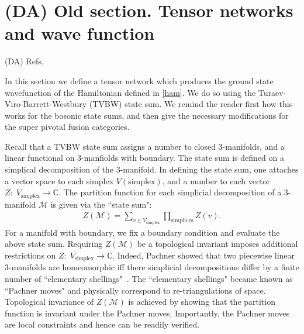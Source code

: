 \documentclass[12pt,a4paper]{article}
\newcounter{arrow}
\newcommand{\ra}{\rightarrow}
\newcommand{\cc}{\mathbb{C}}
\newcommand{\mcm}{\mathcal{M}}
\newcommand{\dave}[1]{{\color{ao(english)}\footnotesize{(DA) #1}}}
\begin{document}
\section{\dave{Old section.} Tensor networks and wave function} 
\dave{Refs.}
\cite{Turaev2010}

In this section we define a tensor network which produces the ground state wavefunction of the Hamiltonian defined in \eqref{ham}.
We do so using the Turaev-Viro-Barrett-Westbury (TVBW) state sum\cite{Turaev1992,Barrett1996}.
We remind the reader first how this works for the bosonic state sums, 
and then give the necessary modifications for the super pivotal fusion categories.



Recall that a TVBW state sum assigns a number to closed 3-manifolds, 
and a linear functional on 3-manfiolds with boundary. 
The state sum is defined on a simplical decomposition of the 3-manifold.
In defining the state sum, one attaches a vector space to each simplex $V(\text{simplex})$, and a number to each vector $Z: \; V_\text{simplex} \ra \cc$.
The partition function for each simplicial decomposition of a 3-manifold $\mcm$ is given via the ``state sum": 
\begin{align}
Z(\mcm) = \sum_{v \in V_\text{simplex} } \prod_{\text{simplices}} Z(v).
\end{align} 
For a manifold with boundary, we fix a boundary condition and evaluate the above state sum. 
Requiring $Z(\mcm)$ be a topological invariant imposes additional restrictions on $Z: \; V_\text{simplex} \ra \cc$. 
Indeed, Pachner showed that two piecewise linear 3-manifolds are homeomorphic 
iff there simplicial decompositions differ by a finite number of ``elementary shellings"~\cite{Pachner1991}.
The ``elementary shellings" became known as ``Pachner moves" and physically correspond to re-triangulations of space.
Topological invariance of $Z(\mcm)$ is achieved by showing that the partition function is invariant under the Pachner moves.
Importantly, the Pachner moves are local constraints and hence can be readily verified.
\end{document}
